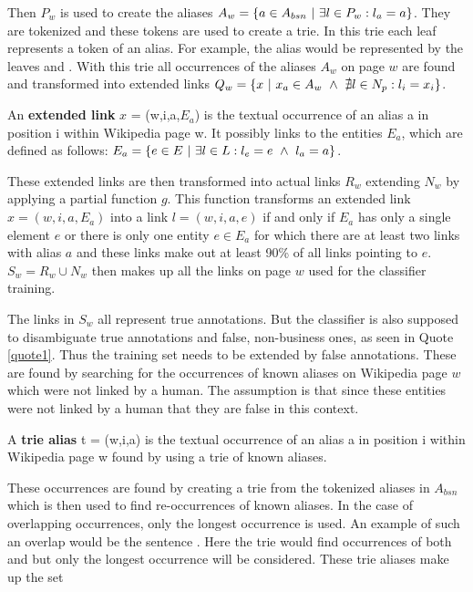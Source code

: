 Then $P_w$ is used to create the aliases $A_w = \{a \in A_{bsn} {\mbox{ }|\mbox{ }} \exists l \in P_w: l_a = a \}$. They are tokenized and these tokens are used to create a trie. In this trie each leaf represents a token of an alias. For example, the alias  would be represented by the leaves  and . With this trie all occurrences of the aliases $A_w$ on page $w$ are found and transformed into extended links $Q_w = \{ x {\mbox{ }|\mbox{ }} x_a \in A_w {\mbox{ }\wedge\mbox{ }} \nexists l \in N_p: l_i = x_i \}$.\par
\begin{definition}
An \textbf{extended link} $x$ = (w,i,a,$E_a$) is the textual occurrence of an alias a in position i within Wikipedia page w. It possibly links to the entities $E_a$, which are defined as follows: $E_a = \{ e \in E {\mbox{ }|\mbox{ }} \exists l \in L: l_e = e {\mbox{ }\wedge\mbox{ }} l_a = a \}$.
\label{extendedlink}
\end{definition}
These extended links are then transformed into actual links $R_w$ extending $N_w$ by applying a partial function $g$.
This function transforms an extended link $x = (w,i,a,E_a)$ into a link $l = (w,i,a,e)$ if and only if $E_a$ has only a single element $e$ or there is only one entity $e \in E_a$ for which there are at least two links with alias $a$ and these links make out at least 90\% of all links pointing to $e$. $S_w = R_w \cup N_w$ then makes up all the links on page $w$ used for the classifier training.\par
The links in $S_w$ all represent true annotations. But the classifier is also supposed to disambiguate true annotations and false, non-business ones, as seen in Quote \ref{quote1}. Thus the training set needs to be extended by false annotations. These are found by searching for the occurrences of known aliases on Wikipedia page $w$ which were not linked by a human. The assumption is that since these entities were not linked by a human that they are false in this context.
\begin{definition}
A \textbf{trie alias} t = (w,i,a) is the textual occurrence of an alias a in position i within Wikipedia page w found by using a trie of known aliases.
\label{triealias}
\end{definition}
These occurrences are found by creating a trie from the tokenized aliases in $A_{bsn}$ which is then used to find re-occurrences of known aliases. In the case of overlapping occurrences, only the longest occurrence is used. An example of such an overlap would be the sentence . Here the trie would find occurrences of both  and  but only the longest occurrence will be considered. These trie aliases make up the set
